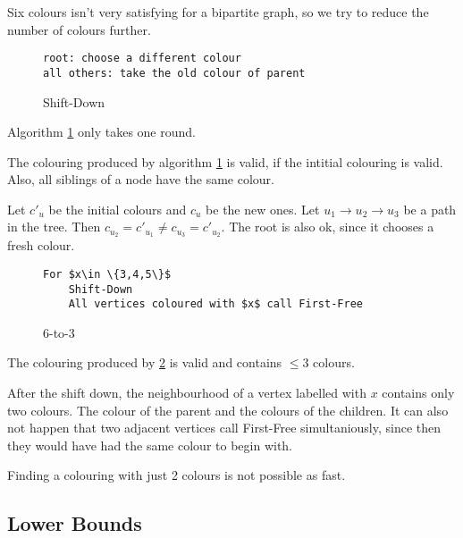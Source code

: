 Six colours isn't very satisfying for a bipartite graph, so we try to reduce the number of colours further.

\begin{figure}[hbt]
\begin{lstlisting}
root: choose a different colour
all others: take the old colour of parent
\end{lstlisting}
\caption{Shift-Down}
\label{alg:Shift-Down}
\end{figure}

Algorithm \ref{alg:Shift-Down} only takes one round.

\begin{lem} The colouring produced by algorithm \ref{alg:Shift-Down} is valid, if the intitial colouring is valid. Also, all siblings of a node have the same colour.\end{lem}

\begin{pr} Let $c'_u$ be the initial colours and $c_u$ be the new ones. Let $u_1\rightarrow u_2 \rightarrow u_3$ be a path in the tree. Then $c_{u_2}=c'_{u_1} \neq c_{u_3}=c'_{u_2}$. The root is also ok, since it chooses a fresh colour.\end{pr}

\begin{figure}[hbt]
\begin{lstlisting}
For $x\in \{3,4,5\}$
	Shift-Down
	All vertices coloured with $x$ call First-Free
\end{lstlisting}
\caption{6-to-3}
\label{alg:6-to-3}
\end{figure}

\begin{lem} The colouring produced by \ref{alg:6-to-3} is valid and contains $\leq 3$ colours.\end{lem}

\begin{pr} After the shift down, the neighbourhood of a vertex labelled with $x$ contains only two colours. The colour of the parent and the colours of the children. It can also not happen that two adjacent vertices call First-Free simultaniously, since then they would have had the same colour to begin with.\end{pr}

Finding a colouring with just 2 colours is not possible as fast.

\subsection{Lower Bounds}